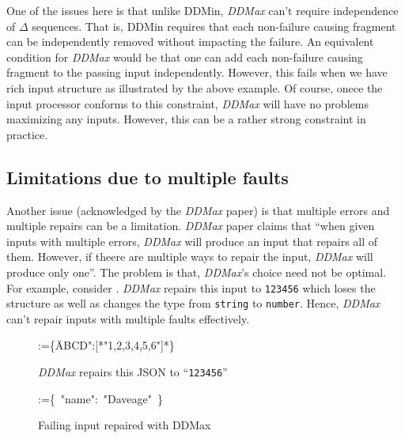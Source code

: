 \documentclass[sigconf,review,anonymous]{acmart}
\makeatletter
\def\<#1>{\texttt{#1}}
\newcounter{todocounter}
\newcommand{\todo}[1]{\marginpar{$|$}\textcolor{red}{\stepcounter{todocounter}\footnote[\thetodocounter]{\textcolor{red}{\textbf{TODO }}\textit{#1}}}}
\renewcommand{\todo}[1]{}
\newcommand{\ddmin}{\textit{ddmin}\xspace}
\def\ddmin{DDMin\xspace}
\newcommand{\ddmax}{\textit{DDMax}\xspace}
\newcommand\letterboxed[1]{%
\setlength{\fboxsep}{0pt}%
  \@tfor\@ii:=#1\do{%
    \fcolorbox{white}{light-gray}{\texttt{\strut\@ii}}%
  }%
}
\makeatother
\begin{document}
One of the issues here is that unlike \ddmin, \ddmax can't require independence
of $\Delta$ sequences. That is, \ddmin requires that each non-failure causing
fragment can be independently removed without impacting the failure. An
equivalent condition for \ddmax would be that one can add each non-failure
causing fragment to the passing input independently. However, this fails
when we have rich input structure as illustrated by the above example.
Of course, onece the input processor conforms to this constraint, \ddmax will
have no problems maximizing any inputs. However, this can be a rather strong
constraint in practice.

\subsection{Limitations due to multiple faults}
\todo{I think that all these issues with \ddmax has one single cause -- the
rich input structure. I have mentioned it above. Perhaps we should simply
consolidate all into one.}
Another issue (acknowledged by the \ddmax paper) is that multiple errors and
multiple repairs can be a limitation. \ddmax paper claims that ``when given
inputs with multiple errors, \ddmax will produce an input that repairs all of
them. However, if theere are multiple ways to repair the input, \ddmax will
produce only one''. The problem is that, \ddmax's choice need not be optimal.
For example, consider . \ddmax repairs this input
to \<123456> which loses the structure as well as changes the type from
\<string> to \<number>. Hence, \ddmax can't repair inputs with multiple faults
effectively.


\begin{figure}
\begin{center}
\letterboxed{\{\"ABCD":[*"1,2,3,4,5,6"]*\}}
\end{center}
\caption{\ddmax repairs this JSON to ``\<123456>''}
\label{fig:bad-json-input2}
\end{figure}

\begin{figure}
\begin{center}
\letterboxed{\{\ "name":\ "Daveage"\ \}}
\end{center}
\caption{Failing input repaired with DDMax}
\label{fig:bad-json-input-ddmax}
\end{figure}
\end{document}
